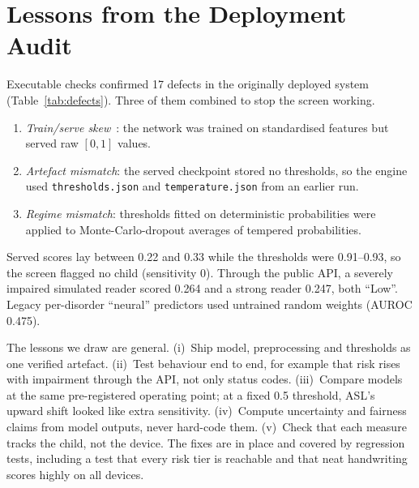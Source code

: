 \documentclass[conference]{IEEEtran}
\begin{document}
\section{Lessons from the Deployment Audit}\label{sec:audit}
Executable checks confirmed 17 defects in the originally deployed system
(Table~\ref{tab:defects}). Three of them combined to stop the screen working.
\begin{enumerate}
\item \emph{Train/serve skew}~\cite{sculley2015}: the network was trained on
standardised features but served raw $[0,1]$ values.
\item \emph{Artefact mismatch}: the served checkpoint stored no thresholds, so the
engine used \texttt{thresholds.json} and \texttt{temperature.json} from an earlier run.
\item \emph{Regime mismatch}: thresholds fitted on deterministic probabilities were
applied to Monte-Carlo-dropout averages of tempered probabilities.
\end{enumerate}
Served scores lay between 0.22 and 0.33 while the thresholds were 0.91--0.93, so the
screen flagged no child (sensitivity 0). Through the public API, a severely impaired
simulated reader scored 0.264 and a strong reader 0.247, both ``Low''. Legacy
per-disorder ``neural'' predictors used untrained random weights (AUROC 0.475).

The lessons we draw are general.
(i)~Ship model, preprocessing and thresholds as one verified artefact.
(ii)~Test behaviour end to end, for example that risk rises with impairment through
the API, not only status codes.
(iii)~Compare models at the same pre-registered operating point; at a fixed 0.5
threshold, ASL's upward shift looked like extra sensitivity.
(iv)~Compute uncertainty and fairness claims from model outputs, never hard-code them.
(v)~Check that each measure tracks the child, not the device.
The fixes are in place and covered by regression tests, including a test that every
risk tier is reachable and that neat handwriting scores highly on all devices.
\end{document}
